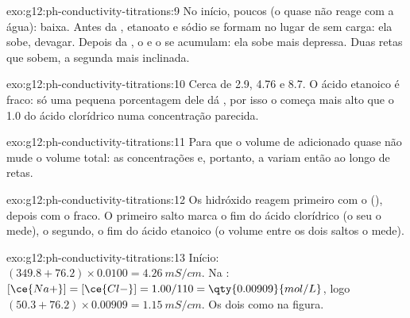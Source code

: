 \begin{solution}{exo:g12:ph-conductivity-titrations:9}
No início, poucos  (o  quase não reage com a água):
 baixa. Antes da ,  etanoato e sódio se
formam no lugar de  sem carga: ela sobe, devagar. Depois da
, o  e o  se acumulam: ela sobe mais
depressa. Duas retas que sobem, a segunda mais inclinada.
\end{solution}

\begin{solution}{exo:g12:ph-conductivity-titrations:10}
Cerca de 2.9, 4.76 e 8.7. O ácido etanoico é fraco: só uma pequena
porcentagem dele dá , por isso o  começa mais alto que o
1.0 do ácido clorídrico numa concentração parecida.
\end{solution}

\begin{solution}{exo:g12:ph-conductivity-titrations:11}
Para que o volume de  adicionado quase não mude o volume total:
as concentrações e, portanto, a  variam então ao longo de
retas.
\end{solution}

\begin{solution}{exo:g12:ph-conductivity-titrations:12}
Os  hidróxido reagem primeiro com o  (), depois
com o fraco. O primeiro salto marca o fim do ácido clorídrico (o seu
 o mede), o segundo, o fim do ácido etanoico (o
volume entre os dois saltos o mede).
\end{solution}

\begin{solution}{exo:g12:ph-conductivity-titrations:13}
Início: $(349.8 + 76.2) \times 0.0100 = \qty{4.26}{mS/cm}$. Na
: $[\ce{Na+}] = [\ce{Cl-}] = 1.00/110 = \qty{0.00909}{mol/L}$,
logo $(50.3 + 76.2) \times 0.00909 = \qty{1.15}{mS/cm}$. Os dois como
na figura.
\end{solution}

